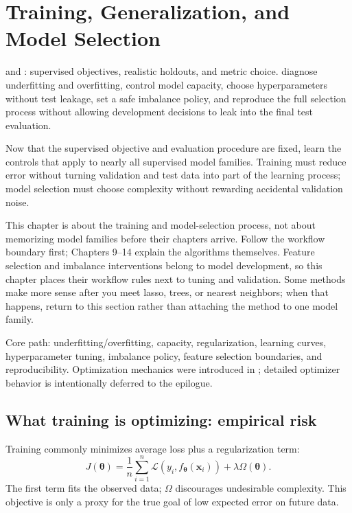 \chapter{Training, Generalization, and Model Selection}
\label{ch:training}

\chapterguide%
  { and : supervised objectives, realistic holdouts, and metric choice.}
  {diagnose underfitting and overfitting, control model capacity, choose hyperparameters without test leakage, set a safe imbalance policy, and reproduce the full selection process without allowing development decisions to leak into the final test evaluation.}

Now that the supervised objective and evaluation procedure are fixed, learn the controls that apply to nearly all supervised model families. Training must reduce error without turning validation and test data into part of the learning process; model selection must choose complexity without rewarding accidental validation noise.

\begin{coursechoice}
This chapter is about the training and model-selection process, not about memorizing model families before their chapters arrive. Follow the workflow boundary first; Chapters 9--14 explain the algorithms themselves. Feature selection and imbalance interventions belong to model development, so this chapter places their workflow rules next to tuning and validation. Some methods make more sense after you meet lasso, trees, or nearest neighbors; when that happens, return to this section rather than attaching the method to one model family.
\end{coursechoice}

\begin{firstread}
Core path: underfitting/overfitting, capacity, regularization, learning curves, hyperparameter tuning, imbalance policy, feature selection boundaries, and reproducibility. Optimization mechanics were introduced in ; detailed optimizer behavior is intentionally deferred to the epilogue.
\end{firstread}

\section{What training is optimizing: empirical risk}

Training commonly minimizes average loss plus a regularization term:
\[
  J(\bm{\theta})
  =\frac{1}{n}\sum_{i=1}^{n}
  \mathcal{L}(y_i,f_{\bm{\theta}}(\bm{x}_i))
  +\lambda\Omega(\bm{\theta}).
\]
The first term fits the observed data; $\Omega$ discourages undesirable complexity. This objective is only a proxy for the true goal of low expected error on future data.

